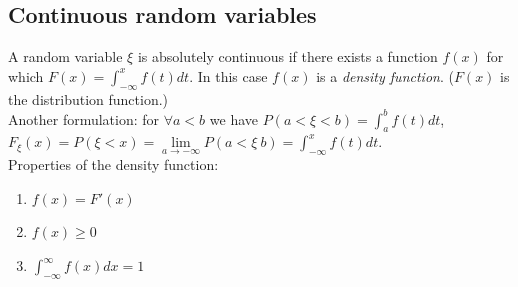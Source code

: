 \documentclass[margin=0px]{article}
\begin{document}
\subsection{Continuous random variables}

A random variable $\xi$ is absolutely continuous if there exists a function $f(x)$ for which $F(x) = \int_{-\infty}^{x}{f(t) dt}$. In this case $f(x)$ is a \textit{density function}. ($F(x)$ is the distribution function.) \\
Another formulation: for $\forall a < b$ we have $P(a < \xi < b) = \int_{a}^{b}{f(t)dt}$, $F_{\xi}(x) = P(\xi < x) = \lim\limits_{a \to -\infty}{P(a < \xi \ b)} = \int_{-\infty}^{x}{f(t)dt}$. \\
Properties of the density function:
\begin{enumerate}
    \item $f(x) = F'(x)$
    \item $f(x) \geq 0$
    \item $\int_{-\infty}^{\infty}{f(x)dx} = 1$
\end{enumerate}
\end{document}
